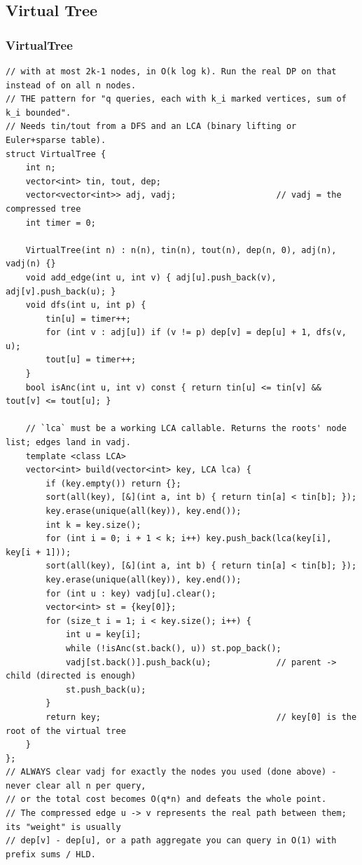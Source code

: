 \documentclass[9pt,a4paper,twocolumn]{extarticle}
\begin{document}
\subsection{Virtual Tree}

\filbreak
\subsubsection{VirtualTree}
\nopagebreak
\begin{lstlisting}
// with at most 2k-1 nodes, in O(k log k). Run the real DP on that instead of on all n nodes.
// THE pattern for "q queries, each with k_i marked vertices, sum of k_i bounded".
// Needs tin/tout from a DFS and an LCA (binary lifting or Euler+sparse table).
struct VirtualTree {
    int n;
    vector<int> tin, tout, dep;
    vector<vector<int>> adj, vadj;                    // vadj = the compressed tree
    int timer = 0;

    VirtualTree(int n) : n(n), tin(n), tout(n), dep(n, 0), adj(n), vadj(n) {}
    void add_edge(int u, int v) { adj[u].push_back(v), adj[v].push_back(u); }
    void dfs(int u, int p) {
        tin[u] = timer++;
        for (int v : adj[u]) if (v != p) dep[v] = dep[u] + 1, dfs(v, u);
        tout[u] = timer++;
    }
    bool isAnc(int u, int v) const { return tin[u] <= tin[v] && tout[v] <= tout[u]; }

    // `lca` must be a working LCA callable. Returns the roots' node list; edges land in vadj.
    template <class LCA>
    vector<int> build(vector<int> key, LCA lca) {
        if (key.empty()) return {};
        sort(all(key), [&](int a, int b) { return tin[a] < tin[b]; });
        key.erase(unique(all(key)), key.end());
        int k = key.size();
        for (int i = 0; i + 1 < k; i++) key.push_back(lca(key[i], key[i + 1]));
        sort(all(key), [&](int a, int b) { return tin[a] < tin[b]; });
        key.erase(unique(all(key)), key.end());
        for (int u : key) vadj[u].clear();
        vector<int> st = {key[0]};
        for (size_t i = 1; i < key.size(); i++) {
            int u = key[i];
            while (!isAnc(st.back(), u)) st.pop_back();
            vadj[st.back()].push_back(u);             // parent -> child (directed is enough)
            st.push_back(u);
        }
        return key;                                   // key[0] is the root of the virtual tree
    }
};
// ALWAYS clear vadj for exactly the nodes you used (done above) - never clear all n per query,
// or the total cost becomes O(q*n) and defeats the whole point.
// The compressed edge u -> v represents the real path between them; its "weight" is usually
// dep[v] - dep[u], or a path aggregate you can query in O(1) with prefix sums / HLD.
\end{lstlisting}
\end{document}
